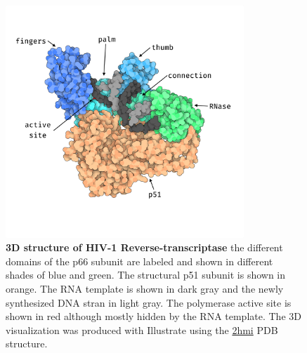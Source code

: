 \documentclass[
  11pt,
  twoside]{scrbook}
\newcommand{\extcaption}[2]{
    \caption[#1]{
        \textbf{#1}\newline
        #2
    }
}
\begin{document}
\begin{figure}[H] 
  \centering 
  \includegraphics[width=0.8\textwidth]{./figures/HIV-Intro/rt.png}      \extcaption{3D structure of HIV-1 Reverse-transcriptase}{the different domains of the p66 subunit are labeled and shown in different shades of blue and green. The structural p51 subunit is shown in orange. The RNA template is shown in dark gray and the newly synthesized DNA stran in light gray. The polymerase active site is shown in red although mostly hidden by the RNA template. The 3D visualization was produced with Illustrate \autocite{goodsellIllustrateSoftwareBiomolecular2019} using the \href{https://www.rcsb.org/structure/2HMI}{2hmi} PDB structure.}       
  \label{fig:rtStruct} 
\end{figure}
\end{document}

